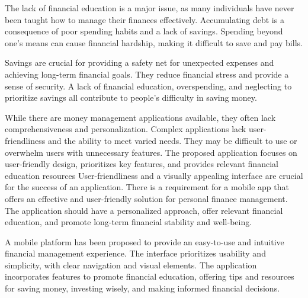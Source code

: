 
\hspace{\parindent}The lack of financial education is a major issue, as many individuals have never been taught how to manage their finances effectively. Accumulating debt is a consequence of poor spending habits and a lack of savings. Spending beyond one’s means can cause financial hardship, making it difficult to save and pay bills.

\hspace{\parindent}Savings are crucial for providing a safety net for unexpected expenses and achieving long-term financial goals. They reduce financial stress and provide a sense of security. A lack of financial education, overspending, and neglecting to prioritize savings all contribute to people's difficulty in saving money.

\hspace{\parindent}While there are money management applications available, they often lack comprehensiveness and personalization. Complex applications lack user-friendliness and the ability to meet varied needs. They may be difficult to use or overwhelm users with unnecessary features. The proposed application focuses on user-friendly design, prioritizes key features, and provides relevant financial education resources User-friendliness and a visually appealing interface are crucial for the success of an application. There is a requirement for a mobile app that offers an effective and user-friendly solution for personal finance management. The application should have a personalized approach, offer relevant financial education, and promote long-term financial stability and well-being.

\hspace{\parindent}A mobile platform has been proposed to provide an easy-to-use and intuitive financial management experience. The interface prioritizes usability and simplicity, with clear navigation and visual elements. The application incorporates features to promote financial education, offering tips and resources for saving money, investing wisely, and making informed financial decisions.

